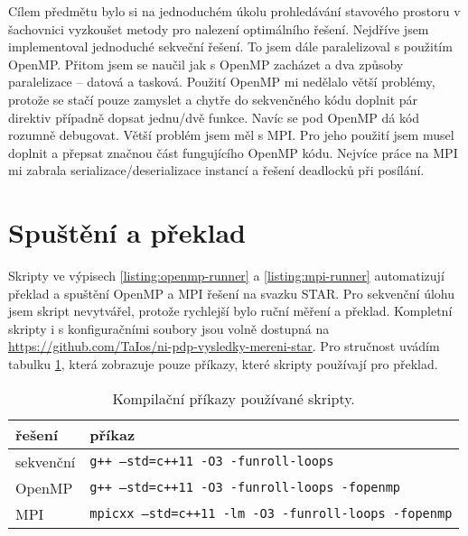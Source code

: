 \documentclass{article}
\newcommand{\const}[1]{\texttt{#1}}
\begin{document}
    Cílem předmětu bylo si na jednoduchém úkolu prohledávání stavového prostoru v šachovnici vyzkoušet metody pro
    nalezení optimálního řešení. Nejdříve jsem implementoval jednoduché sekveční řešení. To jsem dále paralelizoval
    s použitím OpenMP. Přitom jsem se naučil jak s OpenMP zacházet a dva způsoby paralelizace – datová a tasková.
    Použití OpenMP mi nedělalo větší problémy, protože se stačí pouze zamyslet a chytře do sekvenčného kódu doplnit
    pár direktiv případně dopsat jednu/dvě funkce. Navíc se pod OpenMP dá kód rozumně debugovat. Větší problém jsem
    měl s MPI. Pro jeho použití jsem musel doplnit a přepsat značnou část fungujícího OpenMP kódu. Nejvíce práce na
    MPI mi zabrala serializace/deserializace instancí a řešení deadlocků při posílání.

    \newpage
    \section{Spuštění a překlad}
    Skripty ve výpisech \ref{listing:openmp-runner} a \ref{listing:mpi-runner}  automatizují překlad a spuštění OpenMP a MPI řešení na svazku STAR.
    Pro sekvenční úlohu jsem skript nevytvářel, protože rychlejší bylo ruční měření a překlad. Kompletní
    skripty i s konfiguračními soubory jsou volně dostupná na \url{https://github.com/TaIos/ni-pdp-vysledky-mereni-star}.
    Pro stručnost uvádím tabulku \ref{tab:compilation-short}, která zobrazuje pouze příkazy, které skripty používají pro překlad.

    \begin{table}[ht]
        \centering
        \begin{tabular}{|l|l|}
            \hline
            řešení    & příkaz                                      \\ \hline
            sekvenční & \const{g++ --std=c++11 -O3 -funroll-loops}          \\ \hline
            OpenMP    & \const{g++ --std=c++11 -O3 -funroll-loops -fopenmp} \\ \hline
            MPI       & \const{mpicxx --std=c++11 -lm -O3 -funroll-loops -fopenmp}   \\ \hline
        \end{tabular}
        \caption{Kompilační příkazy používané skripty.}
        \label{tab:compilation-short}
    \end{table}
    
\end{document}
